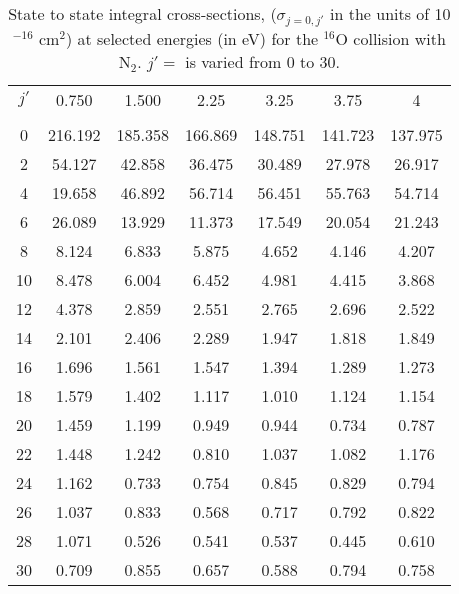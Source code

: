 \documentclass[fleqn,usenatbib]{mnras}
\begin{document}
\begin{table*} %
\caption{\label{tab:table_cross}State to state integral cross-sections, ($\sigma_{j=0,j'}$ in the units of 10$^{-16}$ cm$^2$) at selected energies (in eV) for the $^{16}$O collision with N$_2$. $j'=$ is varied from 0 to 30.}
\centering
\begin{tabular}{ccccccc}
\cline{1-7}
$j'$  &    0.750  &     1.500   &   2.25    &   3.25  &   3.75  & 4    \\
\cline{1-7}\\
 0    &  216.192  &   185.358   & 166.869   & 148.751 & 141.723 & 137.975 \\
 2	 &   54.127  &    42.858   &  36.475   & 30.489  & 27.978  & 26.917  \\
 4	 &   19.658  &    46.892   &  56.714   & 56.451  & 55.763  & 54.714  \\
 6	 &   26.089  &    13.929   &  11.373   & 17.549  & 20.054  & 21.243  \\
 8	 &    8.124  &    6.833    &   5.875   &  4.652  &  4.146  &  4.207  \\
10	  &    8.478  &    6.004    &   6.452   &  4.981  &  4.415  &  3.868  \\
12	  &    4.378  &    2.859    &   2.551   &  2.765  &  2.696  &  2.522  \\
14	  &    2.101  &    2.406    &   2.289   &  1.947  &  1.818  &  1.849  \\
16	  &    1.696  &    1.561    &   1.547   &  1.394  &  1.289  &  1.273  \\
18	  &    1.579  &    1.402    &   1.117   &  1.010  &  1.124  &  1.154  \\
20	  &    1.459  &    1.199    &   0.949   &  0.944  &  0.734  &  0.787  \\
22	  &    1.448  &    1.242    &   0.810   &  1.037  &  1.082  &  1.176  \\
24	  &    1.162  &    0.733    &   0.754   &  0.845  &  0.829  &  0.794  \\
26	  &    1.037  &    0.833    &   0.568   &  0.717  &  0.792  &  0.822  \\
28	  &    1.071  &    0.526    &   0.541   &  0.537  &  0.445  &  0.610  \\
30	  &    0.709  &    0.855    &   0.657   &  0.588  &  0.794  &  0.758  \\
\cline{1-7}
\end{tabular}
\end{table*}
\end{document}
